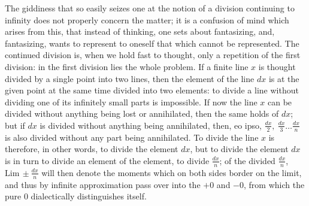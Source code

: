 \documentclass[12pt,a4paper,openany]{book}
\newcommand{\opage}[1]{\marginnote{\footnotesize\textit{[#1]}}}
\begin{document}
\setcounter{footnote}{0}%
\opage{123}The giddiness that so easily seizes one at the notion
of a division continuing to infinity
does not properly concern the matter; it is a confusion of mind
which arises from this, that instead of thinking, one
sets about fantasizing, and, fantasizing, wants to represent to oneself that which
cannot be represented. The continued division is, when we
hold fast to thought, only a repetition of the first division:
in the first division lies the whole problem. If a finite
line $x$ is thought divided by a single point into two lines, then the element of the line
$dx$ is at the given point at the same time
divided into two elements: to divide a line without dividing one of
its infinitely small parts is impossible. If now the line $x$ can be divided without anything being lost or annihilated, then the same
holds of $dx$; but if $dx$ is divided without anything being
annihilated, then, eo ipso, $\frac{dx}{2},\ \frac{dx}{3}\ldots\frac{dx}{n}$ is also divided
without any part being annihilated.
To divide the line $x$ is therefore, in other words, to divide the element $dx$, but to divide
the element $dx$ is in turn to divide an element of the element, to
divide $\frac{dx}{n}$; of the divided $\frac{dx}{n}$, $\mathrm{Lim}\,\pm\frac{dx}{n}$ will then denote the moments
which on both sides border on the limit, and
thus by infinite approximation pass over into the $+0$ and $-0$, from which the pure $0$ dialectically distinguishes itself.
\end{document}
